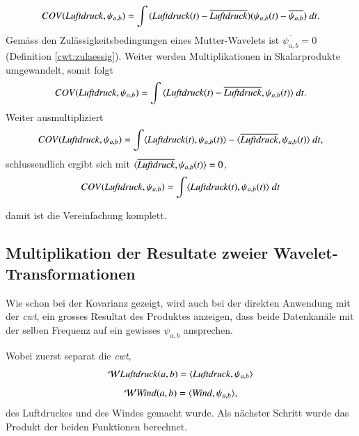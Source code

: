 \begin{refsection}
\begin{equation}
COV(\text{\textit{Luftdruck}}, \psi_{a,b}) = \int{(\text{\textit{Luftdruck}}(t)- \overline{\text{\textit{Luftdruck}}})(\psi_{a,b}(t)- \overline{\psi_{a,b}}) \text{\space}dt}.
\end{equation}
Gemäss den Zulässigkeitsbedingungen eines Mutter-Wavelets ist $\overline{\psi_{a,b}} = 0$ (Definition \ref{cwt:zulaessig}). Weiter werden Multiplikationen in Skalarprodukte umgewandelt, somit folgt
\begin{equation}
COV(\text{\textit{Luftdruck}}, \psi_{a,b}) =  \int{\langle \text{\textit{Luftdruck}}(t)- \overline{\text{\textit{Luftdruck}}},\psi_{a,b}(t) \rangle \text{\space}dt}.
\end{equation}
Weiter ausmultipliziert
\begin{equation}
COV(\text{\textit{Luftdruck}}, \psi_{a,b}) = \int	\langle \text{\textit{Luftdruck}}(t),\psi_{a,b}(t)\rangle - \langle \overline{\text{\textit{Luftdruck}}},\psi_{a,b}(t)\rangle \text{\space}dt,
\end{equation}
schlussendlich ergibt sich mit $\langle \overline{\text{\textit{Luftdruck}}},\psi_{a,b}(t) \rangle = 0$,
\begin{equation}
\begin{split}
COV(\text{\textit{Luftdruck}}, \psi_{a,b}) &= \int \langle \text{\textit{Luftdruck}}(t),\psi_{a,b}(t)\rangle \text{\space}dt \\
\label{eq:wwt_kovarianz}
\end{split}
\end{equation}

damit ist die Vereinfachung komplett.


\subsection{Multiplikation der Resultate zweier Wavelet-Transformationen}

Wie schon bei der Kovarianz gezeigt, wird auch bei der direkten Anwendung mit der \textit{cwt}, ein grosses Resultat des Produktes anzeigen, dass beide Datenkanäle mit der selben Frequenz auf ein gewisses $\psi_{a,b}$ ansprechen.  

Wobei zuerst separat die \textit{cwt}, 
\begin{equation}
\mathcal{W}\text{\textit{Luftdruck}}(a,b) = \langle \text{\textit{Luftdruck}},\psi_{a,b}\rangle
\end{equation}
\begin{equation}
\mathcal{W}\text{\textit{Wind}}(a,b) = \langle \text{\textit{Wind}},\psi_{a,b}\rangle,
\end{equation}
des Luftdruckes und des Windes gemacht wurde.
Als nächster Schritt wurde das Produkt der beiden Funktionen berechnet.


\end{refsection}
